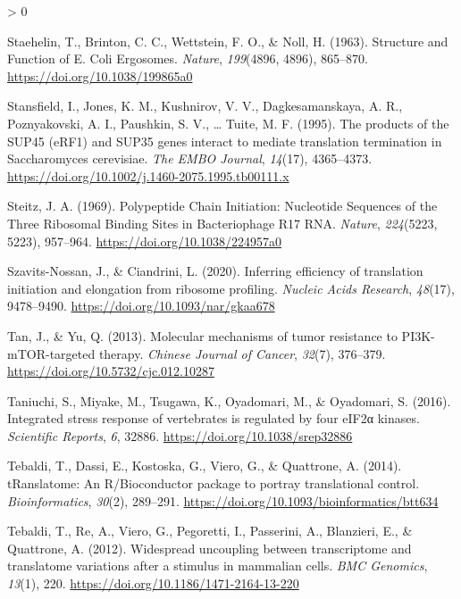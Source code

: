 \documentclass[
  12pt,
  openany]{book}
\newlength{\cslhangindent}
\newenvironment{CSLReferences}[2] %
 {%
  \setlength{\parindent}{0pt}
  \ifodd #1 \everypar{\setlength{\hangindent}{\cslhangindent}}\ignorespaces\fi
  \ifnum #2 > 0
  \setlength{\parskip}{#2\baselineskip}
  \fi
 }%
 {}
\begin{document}
\begin{CSLReferences}{1}{0}
\leavevmode\hypertarget{ref-Staehelin1963}{}%
Staehelin, T., Brinton, C. C., Wettstein, F. O., \& Noll, H. (1963). Structure and {Function} of {E}. {Coli Ergosomes}. \emph{Nature}, \emph{199}(4896, 4896), 865--870. \url{https://doi.org/10.1038/199865a0}

\leavevmode\hypertarget{ref-Stansfield1995}{}%
Stansfield, I., Jones, K. M., Kushnirov, V. V., Dagkesamanskaya, A. R., Poznyakovski, A. I., Paushkin, S. V., \ldots{} Tuite, M. F. (1995). The products of the {SUP45} ({eRF1}) and {SUP35} genes interact to mediate translation termination in {Saccharomyces} cerevisiae. \emph{The EMBO Journal}, \emph{14}(17), 4365--4373. \url{https://doi.org/10.1002/j.1460-2075.1995.tb00111.x}

\leavevmode\hypertarget{ref-Steitz1969}{}%
Steitz, J. A. (1969). Polypeptide {Chain Initiation}: {Nucleotide Sequences} of the {Three Ribosomal Binding Sites} in {Bacteriophage R17 RNA}. \emph{Nature}, \emph{224}(5223, 5223), 957--964. \url{https://doi.org/10.1038/224957a0}

\leavevmode\hypertarget{ref-Szavits-Nossan2020a}{}%
Szavits-Nossan, J., \& Ciandrini, L. (2020). Inferring efficiency of translation initiation and elongation from ribosome profiling. \emph{Nucleic Acids Research}, \emph{48}(17), 9478--9490. \url{https://doi.org/10.1093/nar/gkaa678}

\leavevmode\hypertarget{ref-Tan2013}{}%
Tan, J., \& Yu, Q. (2013). Molecular mechanisms of tumor resistance to {PI3K}-{mTOR}-targeted therapy. \emph{Chinese Journal of Cancer}, \emph{32}(7), 376--379. \url{https://doi.org/10.5732/cjc.012.10287}

\leavevmode\hypertarget{ref-Taniuchi2016}{}%
Taniuchi, S., Miyake, M., Tsugawa, K., Oyadomari, M., \& Oyadomari, S. (2016). Integrated stress response of vertebrates is regulated by four {eIF2α} kinases. \emph{Scientific Reports}, \emph{6}, 32886. \url{https://doi.org/10.1038/srep32886}

\leavevmode\hypertarget{ref-Tebaldi2014}{}%
Tebaldi, T., Dassi, E., Kostoska, G., Viero, G., \& Quattrone, A. (2014). {tRanslatome}: An {R}/{Bioconductor} package to portray translational control. \emph{Bioinformatics}, \emph{30}(2), 289--291. \url{https://doi.org/10.1093/bioinformatics/btt634}

\leavevmode\hypertarget{ref-Tebaldi2012}{}%
Tebaldi, T., Re, A., Viero, G., Pegoretti, I., Passerini, A., Blanzieri, E., \& Quattrone, A. (2012). Widespread uncoupling between transcriptome and translatome variations after a stimulus in mammalian cells. \emph{BMC Genomics}, \emph{13}(1), 220. \url{https://doi.org/10.1186/1471-2164-13-220}


\end{CSLReferences}
\end{document}
